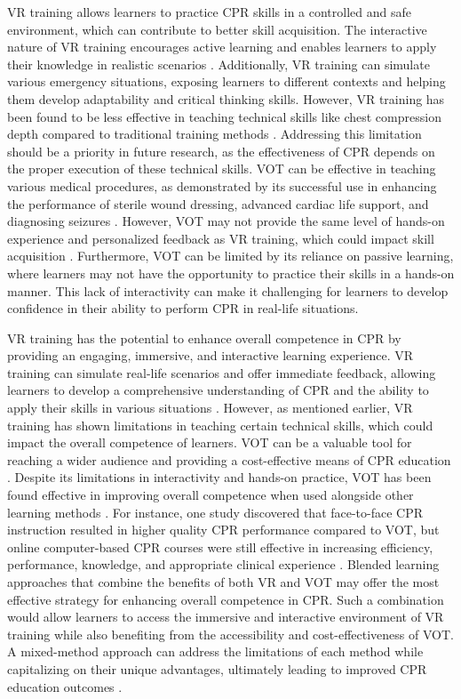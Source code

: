 \documentclass[manuscript]{./Models/acmart}
\begin{document}
VR training allows learners to practice CPR skills in a controlled and safe environment, which can contribute to better skill acquisition. The interactive nature of VR training encourages active learning and enables learners to apply their knowledge in realistic scenarios \cite{almousa-2019, pottle-2019}. Additionally, VR training can simulate various emergency situations, exposing learners to different contexts and helping them develop adaptability and critical thinking skills. However, VR training has been found to be less effective in teaching technical skills like chest compression depth compared to traditional training methods \cite{nas-2021}. Addressing this limitation should be a priority in future research, as the effectiveness of CPR depends on the proper execution of these technical skills.
VOT can be effective in teaching various medical procedures, as demonstrated by its successful use in enhancing the performance of sterile wound dressing, advanced cardiac life support, and diagnosing seizures \cite{seneviratne-2014,Lau-2019, boecker-2022}. However, VOT may not provide the same level of hands-on experience and personalized feedback as VR training, which could impact skill acquisition \cite {qingyang-2021}. Furthermore, VOT can be limited by its reliance on passive learning, where learners may not have the opportunity to practice their skills in a hands-on manner. This lack of interactivity can make it challenging for learners to develop confidence in their ability to perform CPR in real-life situations.

VR training has the potential to enhance overall competence in CPR by providing an engaging, immersive, and interactive learning experience. VR training can simulate real-life scenarios and offer immediate feedback, allowing learners to develop a comprehensive understanding of CPR and the ability to apply their skills in various situations \cite{almousa-2019, pottle-2019, creutzfeldt-2016}. However, as mentioned earlier, VR training has shown limitations in teaching certain technical skills, which could impact the overall competence of learners. VOT can be a valuable tool for reaching a wider audience and providing a cost-effective means of CPR education \cite{todd-1998,qingyang-2021}. Despite its limitations in interactivity and hands-on practice, VOT has been found effective in improving overall competence when used alongside other learning methods \cite{braslow-1997, paglino-2019, Perkins-2012}. For instance, one study discovered that face-to-face CPR instruction resulted in higher quality CPR performance compared to VOT, but online computer-based CPR courses were still effective in increasing efficiency, performance, knowledge, and appropriate clinical experience \cite{lewinson-2003, braslow-1997}. Blended learning approaches that combine the benefits of both VR and VOT may offer the most effective strategy for enhancing overall competence in CPR. Such a combination would allow learners to access the immersive and interactive environment of VR training while also benefiting from the accessibility and cost-effectiveness of VOT. A mixed-method approach can address the limitations of each method while capitalizing on their unique advantages, ultimately leading to improved CPR education outcomes \cite{qingyang-2021}.
\end{document}
